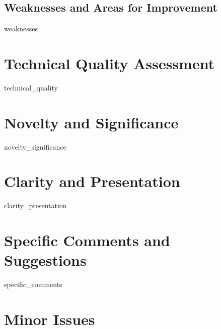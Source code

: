 \documentclass[11pt,letterpaper]{article}
\begin{document}
\subsection{Weaknesses and Areas for Improvement}

\begin{weaknessesbox}
{{ weaknesses }}
\end{weaknessesbox}

\section{Technical Quality Assessment}

{{ technical_quality }}

\section{Novelty and Significance}

{{ novelty_significance }}

\section{Clarity and Presentation}

{{ clarity_presentation }}

\section{Specific Comments and Suggestions}

{{ specific_comments }}

\section{Minor Issues}
\end{document}
